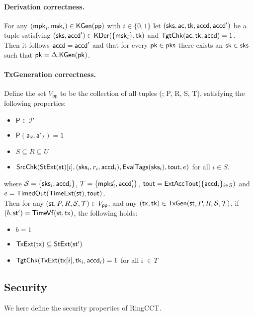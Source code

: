 \paragraph*{Derivation correctness.} For any $(\mathsf{mpk}_i, \mathsf{msk}_i) \in \mathsf{KGen}(\mathsf{pp})$ with $i \in \{0, 1\}$ let $(\mathsf{sks}, \mathsf{ac}, \mathsf{tk}, \mathsf{accd}, \mathsf{accd}')$ be a tuple satisfying  $(\mathsf{sks}, \mathsf{accd}') \in \mathsf{KDer}(\{\mathsf{msk}_i\}, \mathsf{tk})$ and $\mathsf{TgtChk}(\mathsf{ac}, \mathsf{tk}, \mathsf{accd}) = 1$. \\ Then it follows $\mathsf{accd} = \mathsf{accd}'$ and  that for every $\mathsf{pk} \in \mathsf{pks}$ there exists an $\mathsf{sk} \in \mathsf{sks}$ such that $\mathsf{pk} = \Delta.\mathsf{KGen}(\mathsf{pk})$.

\paragraph*{TxGeneration correctness.} Define the set $V_\mathsf{pp}$ to be the collection of all tuples (\st, P, R, S, T), satisfying the following properties:
\begin{itemize}
\item $\mathsf{P} \in \mathcal{P}$
\item $\mathsf{P}(\mathsf{a}_S, \mathsf{a}'_T) = 1$
\item $S \subseteq R \subseteq U$
\item $\mathsf{SrcChk}(\mathsf{StExt}(\mathsf{st})[i], (\mathsf{sks}_{i}, r_i, \mathsf{accd}_i), \mathsf{EvalTags}(\mathsf{sks}_i), \mathsf{tout}, e)$ for all $i \in S$.
\end{itemize}

where $\mathcal{S} = \{ \mathsf{sks}_i, \mathsf{accd}_i \}$, $\mathcal{T} = \{ \mathsf{mpks}'_i, \mathsf{accd}'_i \}$, $\mathsf{tout} = \mathsf{ExtAccTout}(\{\mathsf{accd}_i \}_{i \in S})$ and $\expired = \mathsf{TimedOut}(\mathsf{TimeExt}(\st), \tout)$. \\ 
Then for any $(\st, P, R, \mathcal{S}, \mathcal{T}) \in V_\mathsf{pp}$, and any $(\tx, \mathsf{tk}) \in \mathsf{TxGen}(\st,  P, R, \mathcal{S}, \mathcal{T})$, if $(b, \mathsf{st'}) = \mathsf{TimeVf}(\st, \tx)$, the following holds:
\begin{itemize}
\item $b = 1$
\item $\mathsf{TxExt}(\tx) \subseteq \mathsf{StExt}(\st')$
\item $\mathsf{TgtChk}(\mathsf{TxExt}(\mathsf{tx}[i], \mathsf{tk}_i, \mathsf{accd}_i) = 1$  for all i $\in T$
\end{itemize}

\subsection{Security}
We here define the security properties of RingCCT.
